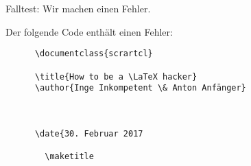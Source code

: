 \begin{frame}[fragile,c]{Falltest: Wir machen einen Fehler.}

  \begin{outputbox}
    Der folgende Code enthält einen Fehler:
  \end{outputbox}
  \vspace{8pt}
  
    \begin{lstlisting}
      \documentclass{scrartcl}

      \title{How to be a \LaTeX hacker}
      \author{Inge Inkompetent \& Anton Anfänger}

      

      \date{30. Februar 2017

        \maketitle

      
    \end{lstlisting}
    
\end{frame}


